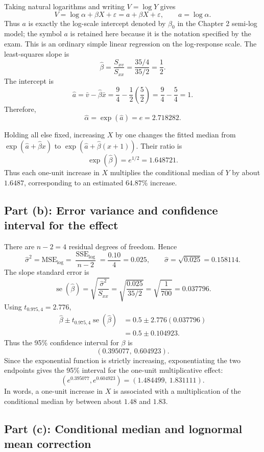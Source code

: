 \documentclass[11pt]{article}
\newcommand{\SSE}{\operatorname{SSE}}
\newcommand{\se}{\operatorname{se}}
\newcommand{\answer}[1]{\boxed{\displaystyle #1}}
\begin{document}
Taking natural logarithms and writing \(V=\log Y\) gives
\[
V=\log\alpha+\beta X+\varepsilon=a+\beta X+\varepsilon,
\qquad a=\log\alpha.
\]
Thus \(a\) is exactly the log-scale intercept denoted by \(\beta_0\) in the
Chapter 2 semi-log model; the symbol \(a\) is retained here because it is the
notation specified by the exam. This is an ordinary simple linear regression
on the log-response scale.
The least-squares slope is
\[
\hat\beta=\frac{S_{xv}}{S_{xx}}
=\frac{35/4}{35/2}=\answer{\frac12}.
\]
The intercept is
\[
\hat a=\bar v-\hat\beta\bar x
=\frac94-\frac12\left(\frac52\right)
=\frac94-\frac54=\answer{1}.
\]
Therefore,
\[
\hat\alpha=\exp(\hat a)=\answer{e=2.718282}.
\]

Holding all else fixed, increasing \(X\) by one changes the fitted median from
\(\exp(\hat a+\hat\beta x)\) to
\(\exp(\hat a+\hat\beta(x+1))\). Their ratio is
\[
\exp(\hat\beta)=e^{1/2}=\answer{1.648721}.
\]
Thus each one-unit increase in \(X\) multiplies the conditional median of
\(Y\) by about \(1.6487\), corresponding to an estimated \(64.87\%\) increase.

\subsection{Part (b): Error variance and confidence interval for the effect}

There are \(n-2=4\) residual degrees of freedom. Hence
\[
\hat\sigma^2=\mathrm{MSE}_{\log}=\frac{\SSE_{\log}}{n-2}
=\frac{0.10}{4}=\answer{0.025},
\qquad
\hat\sigma=\sqrt{0.025}=0.158114.
\]
The slope standard error is
\[
\se(\hat\beta)
=\sqrt{\frac{\hat\sigma^2}{S_{xx}}}
=\sqrt{\frac{0.025}{35/2}}
=\sqrt{\frac1{700}}
=\answer{0.037796}.
\]
Using \(t_{0.975,4}=2.776\),
\begin{align*}
\hat\beta\pm t_{0.975,4}\se(\hat\beta)
&=0.5\pm2.776(0.037796)\\
&=0.5\pm0.104923.
\end{align*}
Thus the 95\% confidence interval for \(\beta\) is
\[
\answer{(0.395077,\ 0.604923)}.
\]
Since the exponential function is strictly increasing, exponentiating the
two endpoints gives the 95\% interval for the one-unit multiplicative effect:
\[
\answer{(e^{0.395077},e^{0.604923})
=(1.484499,\ 1.831111)}.
\]
In words, a one-unit increase in \(X\) is associated with a multiplication
of the conditional median by between about \(1.48\) and \(1.83\).

\subsection{Part (c): Conditional median and lognormal mean correction}
\end{document}
